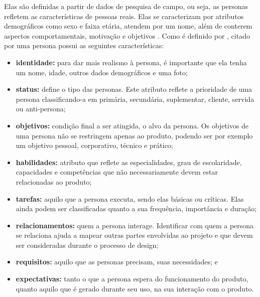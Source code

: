 Elas são definidas a partir de dados de pesquisa de campo, ou seja, as personas refletem as características de pessoas reais. Elas se caracterizam por atributos demográficos como sexo e faixa etária, atendem por um nome, além de conterem aspectos comportamentais, motivação e objetivos \cite[p. 81]{Vianna_2014}. Como é definido por , citado por \cite[p. 153-154]{BarbosaEtAl2021} uma persona possui as seguintes características: 

\begin{itemize}
    \item \textbf{identidade:} para dar mais realismo à persona, é importante que ela tenha um nome, idade, outros dados demográficos e uma foto;

    \item \textbf{status:} define o tipo das personas. Este atributo reflete a prioridade de uma persona classificando-a em primária, secundária, suplementar, cliente, servida ou anti-persona;

    \item \textbf{objetivos:} condição final a ser atingida, o alvo da persona. Os objetivos de uma persona não se restringem apenas ao produto, podendo ser por exemplo um objetivo pessoal, corporativo, técnico e prático;

    \item \textbf{habilidades:} atributo que reflete as especialidades, grau de escolaridade, capacidades e competências que não necessariamente devem estar relacionadas ao produto; 

    \item \textbf{tarefas:} aquilo que a persona executa, sendo elas básicas ou críticas. Elas ainda podem ser classificadas quanto a sua frequência, importância e duração;
    
    \item \textbf{relacionamentos:} quem a persona interage. Identificar com quem a persona se relaciona ajuda a mapear outras partes envolvidas ao projeto e que devem ser consideradas durante o processo de design;
    
    \item \textbf{requisitos:} aquilo que as personas precisam, suas necessidades; e
    
    \item \textbf{expectativas:} tanto o que a persona espera do funcionamento do produto, quanto aquilo que é gerado durante seu uso, na sua interação com o produto.
\end{itemize}

